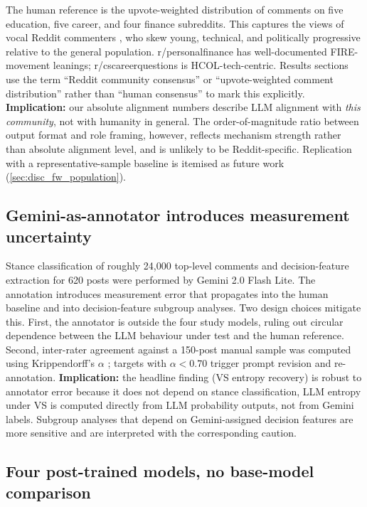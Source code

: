 The human reference is the upvote-weighted distribution of comments
on five education, five career, and four finance subreddits. This
captures the views of vocal Reddit commenters
\citep{sachdeva-2025-aita}, who skew young, technical, and politically
progressive relative to the general population. r/personalfinance has well-documented FIRE-movement
leanings; r/cscareerquestions is HCOL-tech-centric. Results sections
use the term ``Reddit community consensus'' or ``upvote-weighted
comment distribution'' rather than ``human consensus'' to mark this
explicitly.
\textbf{Implication:} our absolute alignment numbers describe LLM
alignment with \emph{this community}, not with humanity in general.
The order-of-magnitude ratio between output format and role framing,
however, reflects mechanism strength rather than absolute alignment
level, and is unlikely to be Reddit-specific. Replication with a
representative-sample baseline is itemised as future work
(\cref{sec:disc_fw_population}).

\subsection{Gemini-as-annotator introduces measurement uncertainty}
\label{sec:disc_lim_annotator}

Stance classification of roughly 24,000 top-level comments and
decision-feature extraction for 620 posts were performed by Gemini
2.0 Flash Lite. The annotation introduces measurement error that
propagates into the human baseline and into decision-feature subgroup
analyses. Two design choices mitigate this. First, the annotator is
outside the four study models, ruling out circular dependence between
the LLM behaviour under test and the human reference. Second,
inter-rater agreement against a 150-post manual sample was computed
using Krippendorff's $\alpha$ ; targets with $\alpha < 0.70$ trigger prompt
revision and re-annotation.
\textbf{Implication:} the headline finding (VS entropy recovery) is
robust to annotator error because it does not depend on stance
classification, LLM entropy under VS is computed directly from LLM
probability outputs, not from Gemini labels. Subgroup analyses that
depend on Gemini-assigned decision features are more sensitive and
are interpreted with the corresponding caution.

\subsection{Four post-trained models, no base-model comparison}
\label{sec:disc_lim_basemodel}

